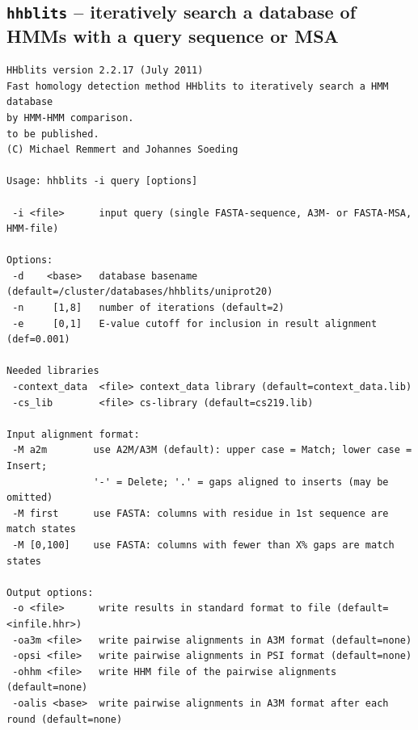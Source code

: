 \documentclass[11pt,a4paper]{article}
\begin{document}
\subsection{{\tt hhblits} -- iteratively search a database of HMMs with a query sequence or MSA}

\small \begin{verbatim}
HHblits version 2.2.17 (July 2011)
Fast homology detection method HHblits to iteratively search a HMM database 
by HMM-HMM comparison.
to be published.
(C) Michael Remmert and Johannes Soeding

Usage: hhblits -i query [options]                                                             

 -i <file>      input query (single FASTA-sequence, A3M- or FASTA-MSA, HMM-file)   

Options:                                                                                 
 -d    <base>   database basename (default=/cluster/databases/hhblits/uniprot20)                                           
 -n     [1,8]   number of iterations (default=2)                                        
 -e     [0,1]   E-value cutoff for inclusion in result alignment (def=0.001)                

Needed libraries                                                                         
 -context_data  <file> context_data library (default=context_data.lib)                                 
 -cs_lib        <file> cs-library (default=cs219.lib)                                           

Input alignment format:                                                       
 -M a2m        use A2M/A3M (default): upper case = Match; lower case = Insert;
               '-' = Delete; '.' = gaps aligned to inserts (may be omitted)   
 -M first      use FASTA: columns with residue in 1st sequence are match states
 -M [0,100]    use FASTA: columns with fewer than X% gaps are match states   

Output options:                                                                          
 -o <file>      write results in standard format to file (default=<infile.hhr>)          
 -oa3m <file>   write pairwise alignments in A3M format (default=none)                   
 -opsi <file>   write pairwise alignments in PSI format (default=none)                   
 -ohhm <file>   write HHM file of the pairwise alignments (default=none)                 
 -oalis <base>  write pairwise alignments in A3M format after each round (default=none)  


\end{verbatim}
\end{document}
